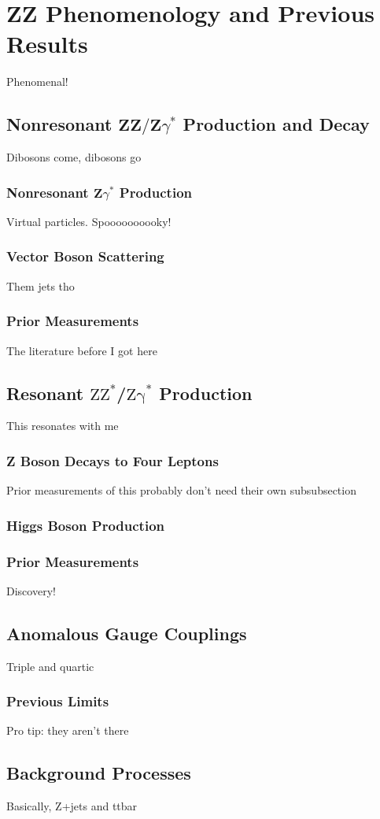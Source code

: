\chapter{ZZ Phenomenology and Previous Results}
Phenomenal!

\section{Nonresonant
         \texorpdfstring{$\mathbf{ZZ/Z}\gamma^\ast$}{ZZ/Zgamma*}
         Production and Decay}
Dibosons come, dibosons go

\subsection{Nonresonant
            \texorpdfstring{$\mathbf{Z}\gamma^\ast$}{Zgamma*}
            Production}
Virtual particles. Spoooooooooky!

\subsection{Vector Boson Scattering}
Them jets tho

\subsection{Prior Measurements}
The literature before I got here


\section{Resonant
         \texorpdfstring{$\mathrm{ZZ}^\ast$/$\mathrm{Z\gamma}^\ast$}
         {ZZ*/Zgamma*}
         Production
         }
This resonates with me

\subsection{Z Boson Decays to Four Leptons}
Prior measurements of this probably don't need their own subsubsection


\subsection{Higgs Boson Production}

\subsection{Prior Measurements}
Discovery!



\section{Anomalous Gauge Couplings}
Triple and quartic

\subsection{Previous Limits}
Pro tip: they aren't there



\section{Background Processes}
Basically, Z+jets and ttbar
